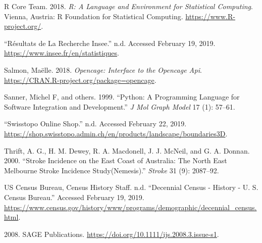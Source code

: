 \documentclass[]{article}
\begin{document}
\leavevmode\hypertarget{ref-R_Core_Team_2018}{}%
R Core Team. 2018. \emph{R: A Language and Environment for Statistical
Computing}. Vienna, Austria: R Foundation for Statistical Computing.
\url{https://www.R-project.org/}.

\leavevmode\hypertarget{ref-insee}{}%
``Résultats de La Recherche Insee.'' n.d. Accessed February 19, 2019.
\url{https://www.insee.fr/en/statistiques}.

\leavevmode\hypertarget{ref-opencage}{}%
Salmon, Maëlle. 2018. \emph{Opencage: Interface to the Opencage Api}.
\url{https://CRAN.R-project.org/package=opencage}.

\leavevmode\hypertarget{ref-sanner1999python}{}%
Sanner, Michel F, and others. 1999. ``Python: A Programming Language for
Software Integration and Development.'' \emph{J Mol Graph Model} 17 (1):
57--61.

\leavevmode\hypertarget{ref-swiss-3d}{}%
``Swisstopo Online Shop.'' n.d. Accessed February 22, 2019.
\url{https://shop.swisstopo.admin.ch/en/products/landscape/boundaries3D}.

\leavevmode\hypertarget{ref-thrift_stroke_2000}{}%
Thrift, A. G., H. M. Dewey, R. A. Macdonell, J. J. McNeil, and G. A.
Donnan. 2000. ``Stroke Incidence on the East Coast of Australia: The
North East Melbourne Stroke Incidence Study(Nemesis).'' \emph{Stroke} 31
(9): 2087--92.

\leavevmode\hypertarget{ref-us_census_bureau_decennial}{}%
US Census Bureau, Census History Staff. n.d. ``Decennial Census -
History - U. S. Census Bureau.'' Accessed February 19, 2019.
\url{https://www.census.gov/history/www/programs/demographic/decennial_census.html}.

\leavevmode\hypertarget{ref-2008}{}%
2008. SAGE Publications.
\url{https://doi.org/10.1111/ijs.2008.3.issue-s1}.
\end{document}
